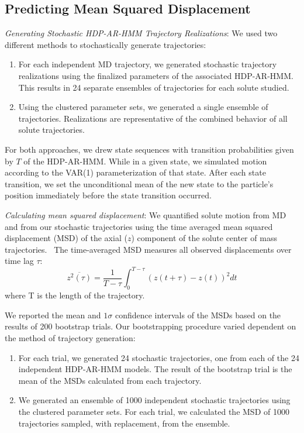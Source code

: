 \documentclass[journal=jpcbfk,manuscript=article]{achemso}
\begin{document}
  \subsection{Predicting Mean Squared Displacement}\label{method:realizations}
  \textit{Generating Stochastic HDP-AR-HMM Trajectory Realizations}: We used two 
  different methods to stochastically generate trajectories:
  \begin{enumerate}[label={Method \theenumi :}, leftmargin=3.5\parindent]
    \item For each independent MD trajectory, we generated stochastic trajectory
    realizations using the finalized parameters of the associated HDP-AR-HMM. This 
    results in 24 separate ensembles of trajectories for each solute studied. 
    \item Using the clustered parameter sets, we generated a single ensemble
	of trajectories. Realizations are representative of the combined behavior
	of all solute trajectories.
  \end{enumerate}
  
  For both approaches, we drew state sequences with transition probabilities given 
  by $T$ of the HDP-AR-HMM. While in a given state, we simulated motion according to the 
  VAR(1) parameterization of that state. After each state transition, we set the 
  unconditional mean of the new state to the particle's position immediately before
  the state transition occurred.
  
  \textit{Calculating mean squared displacement}: We quantified solute motion from
  MD and from our stochastic trajectories using the time averaged mean squared 
  displacement (MSD) of the axial ($z$) component of the solute center of mass
  trajectories.~\cite{meroz_toolbox_2015} The time-averaged MSD measures all observed 
  displacements over time lag $\tau$:
  \begin{equation}
  	\overline{z^2(\tau)} = \dfrac{1}{T - \tau}\int_{0}^{T - \tau} (z(t + \tau) - z(t))^2 dt
  \label{eqn:tamsd}
  \end{equation}
  where T is the length of the trajectory. 
  
  We reported the mean and $1 \sigma$ confidence intervals of the MSDs based on the 
  results of 200 bootstrap trials. Our bootstrapping procedure varied dependent on the
  method of trajectory generation:
  \begin{enumerate}[label={Method \theenumi :}, leftmargin=3.5\parindent]
  	\item For each trial, we generated 24 stochastic trajectories, one from each of
  	the 24 independent HDP-AR-HMM models. The result of the bootstrap trial is the mean
  	of the MSDs calculated from each trajectory. 
    \item We generated an ensemble of 1000 independent stochastic trajectories using
    the clustered parameter sets. For each trial, we calculated the MSD of 1000 
    trajectories sampled, with replacement, from the ensemble.
  \end{enumerate}
\end{document}
